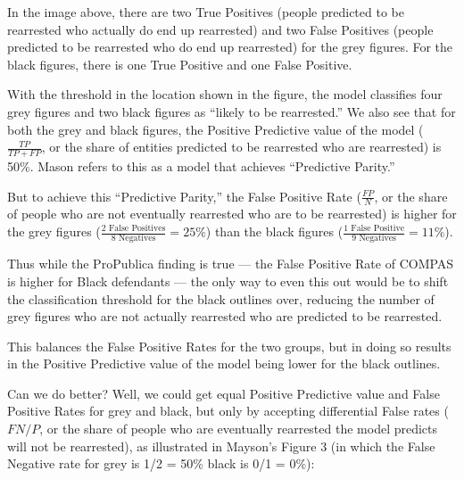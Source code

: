 \documentclass[letterpaper,10pt,english]{jupyterBook}
\begin{document}
\sphinxAtStartPar
In the image above, there are two True Positives (people predicted to be re\sphinxhyphen{}arrested who actually do end up re\sphinxhyphen{}arrested) and two False Positives (people predicted to be re\sphinxhyphen{}arrested who do  end up re\sphinxhyphen{}arrested) for the grey figures. For the black figures, there is one True Positive and one False Positive.

\sphinxAtStartPar
With the threshold in the location shown in the figure, the model classifies four grey figures and two black figures as “likely to be rearrested.” We also see that for both the grey and black figures, the Positive Predictive value of the model (\(\frac{TP}{TP + FP}\), or the share of entities predicted to be re\sphinxhyphen{}arrested who are re\sphinxhyphen{}arrested) is 50\%. Mason refers to this as a model that achieves “Predictive Parity.”

\sphinxAtStartPar
But to achieve this “Predictive Parity,” the False Positive Rate (\(\frac{FP}{N}\), or the share of people who are not eventually re\sphinxhyphen{}arrested who are  to be re\sphinxhyphen{}arrested) is higher for the grey figures (\(\frac{2 \text{ False Positives}}{8 \text{ Negatives}} = 25\%\)) than the black figures (\(\frac{1 \text{ False Positive}}{9 \text{ Negatives}} = 11\%\)).

\sphinxAtStartPar
Thus while the ProPublica finding is true — the False Positive Rate of COMPAS is higher for Black defendants — the only way to even this out would be to shift the classification threshold for the black outlines over, reducing the number of grey figures who are not actually re\sphinxhyphen{}arrested who are predicted to be re\sphinxhyphen{}arrested.

\sphinxAtStartPar
{}

\sphinxAtStartPar
This balances the False Positive Rates for the two groups, but in doing so results in the Positive Predictive value of the model being lower for the black outlines.

\sphinxAtStartPar
Can we do better? Well, we could get equal Positive Predictive value and False Positive Rates for grey and black, but only by accepting differential False  rates (\(FN/P\), or the share of people who are eventually re\sphinxhyphen{}arrested the model predicts will not be re\sphinxhyphen{}arrested), as illustrated in Mayson’s Figure 3 (in which the False Negative rate for grey is 1/2 = 50\% black is 0/1 = 0\%):
\end{document}
